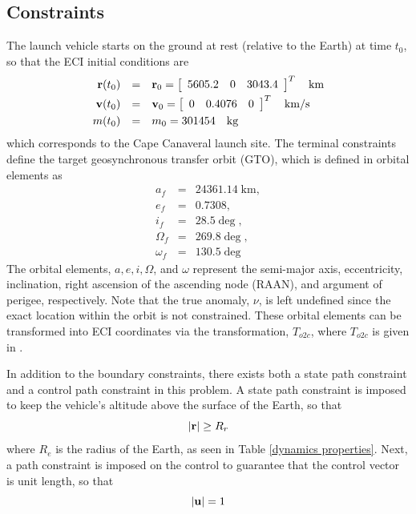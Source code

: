 \documentclass[10pt,final]{report}
\begin{document}
\subsection{Constraints}
The launch vehicle starts on the ground at rest (relative to the Earth) at time $t_0$, so that the ECI initial conditions are
\begin{equation}\label{ICs}
\begin{array}{rcl}
{\bf r}(t_0) &=& {\bf r}_0 = \left[ \begin{array}{ccc} 5605.2 & 0 & 3043.4 \end{array} \right] ^T\quad \mbox{km} \vspace{3pt}\\
{\bf v}(t_0) &=& {\bf v}_0 = \left[ \begin{array}{ccc} 0 & 0.4076 & 0 \end{array} \right]^T \quad \mbox{km/s} \vspace{3pt}\\
m(t_0) &=& m_0 = 301454 \quad \mbox{kg}
\end{array}
\end{equation}
which corresponds to the Cape Canaveral launch site.  The terminal constraints
define the target geosynchronous transfer orbit (GTO), which is defined in
orbital elements as
\begin{equation}\label{FCs}
\begin{array}{rcl}
 a_f &=   &  24361.14 \; \mbox{km}, \\
 e_f &=   &  0.7308, \\
 i_f &=   &  28.5\deg,\\
 \Omega_f &= & 269.8\deg, \\
 \omega_f &= & 130.5\deg
\end{array}
\end{equation}
The orbital elements, $a,e,i,\Omega$, and $\omega$ represent the semi-major
axis, eccentricity, inclination, right ascension of the ascending node
(RAAN), and argument of perigee, respectively.  Note that the true anomaly,
$\nu$, is left undefined since the exact location within the orbit is not
constrained.  These orbital elements can be transformed into ECI coordinates
via the transformation, $T_{o2c}$, where $T_{o2c}$ is given in \cite{Bate1}.

In addition to the boundary constraints, there exists both a state path
constraint and a control path constraint in this problem.  A state path
constraint is imposed to keep the vehicle's altitude above the surface of the
Earth, so that
\begin{equation}\label{xpath}
|{\bf r}|\geq R_r
\end{equation}
where $R_e$ is the radius of the Earth, as seen in Table \ref{dynamics
  properties}.  Next, a path constraint is imposed on the control to guarantee
that the control vector is unit length, so that
\begin{equation}\label{upath}
|{\bf u}| = 1
\end{equation}
\end{document}
